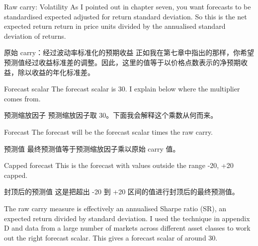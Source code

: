 \bipairgap

\begin{englishblock} Raw carry: Volatility As I pointed out in chapter seven, you want forecasts to be standardised expected adjusted for return standard deviation. So this is the net expected return return in price units divided by the annualised standard deviation of returns. \end{englishblock}

\begin{chineseblock}原始 carry：经过波动率标准化的预期收益 正如我在第七章中指出的那样，你希望预测值经过收益标准差的调整。因此，这里的值等于以价格点数表示的净预期收益，除以收益的年化标准差。\end{chineseblock}

\bipairgap

\begin{englishblock} Forecast scalar The forecast scalar is 30. I explain below where the multiplier comes from. \end{englishblock}

\begin{chineseblock}预测缩放因子 预测缩放因子取 30。下面我会解释这个乘数从何而来。\end{chineseblock}

\bipairgap

\begin{englishblock} Forecast The forecast will be the forecast scalar times the raw carry. \end{englishblock}

\begin{chineseblock}预测值 最终预测值等于预测缩放因子乘以原始 carry 值。\end{chineseblock}

\bipairgap

\begin{englishblock} Capped forecast This is the forecast with values outside the range -20, +20 capped. \end{englishblock}

\begin{chineseblock}封顶后的预测值 这是把超出 -20 到 +20 区间的值进行封顶后的最终预测值。\end{chineseblock}


\begin{englishblock} The raw carry measure is effectively an annualised Sharpe ratio (SR), an expected return divided by standard deviation. I used the technique in appendix D and data from a large number of markets across different asset classes to work out the right forecast scalar. This gives a forecast scalar of around 30. \end{englishblock}

